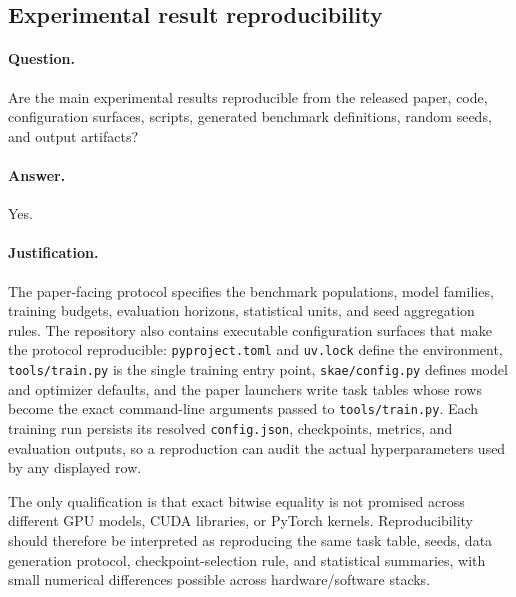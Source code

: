 \subsection{Experimental result reproducibility}
\label{app:checklist_experimental_reproducibility}

\paragraph{Question.}
Are the main experimental results reproducible from the released paper, code,
configuration surfaces, scripts, generated benchmark definitions, random seeds,
and output artifacts?

\paragraph{Answer.}
Yes.

\paragraph{Justification.}
The paper-facing protocol specifies the benchmark populations, model families,
training budgets, evaluation horizons, statistical units, and seed aggregation
rules. The repository also contains executable configuration surfaces that make
the protocol reproducible: \texttt{pyproject.toml} and \texttt{uv.lock} define
the environment, \texttt{tools/train.py} is the single training entry point,
\texttt{skae/config.py} defines model and optimizer defaults, and the paper
launchers write task tables whose rows become the exact command-line arguments
passed to \texttt{tools/train.py}. Each training run persists its resolved
\texttt{config.json}, checkpoints, metrics, and evaluation outputs, so a
reproduction can audit the actual hyperparameters used by any displayed row.

The only qualification is that exact bitwise equality is not promised across
different GPU models, CUDA libraries, or PyTorch kernels. Reproducibility should
therefore be interpreted as reproducing the same task table, seeds, data
generation protocol, checkpoint-selection rule, and statistical summaries, with
small numerical differences possible across hardware/software stacks.

